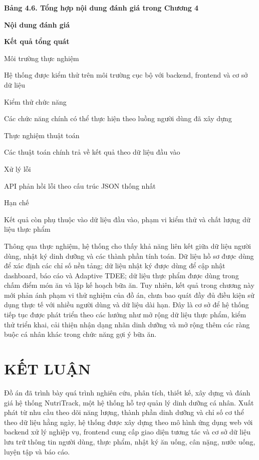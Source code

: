 \textbf{Bảng 4.6. Tổng hợp nội dung đánh giá trong Chương 4}

\textbf{Nội dung đánh giá}

\textbf{Kết quả tổng quát}

Môi trường thực nghiệm

Hệ thống được kiểm thử trên môi trường cục bộ với backend, frontend và cơ sở dữ liệu

Kiểm thử chức năng

Các chức năng chính có thể thực hiện theo luồng người dùng đã xây dựng

Thực nghiệm thuật toán

Các thuật toán chính trả về kết quả theo dữ liệu đầu vào

Xử lý lỗi

API phản hồi lỗi theo cấu trúc JSON thống nhất

Hạn chế

Kết quả còn phụ thuộc vào dữ liệu đầu vào, phạm vi kiểm thử và chất lượng dữ liệu thực phẩm

Thông qua thực nghiệm, hệ thống cho thấy khả năng liên kết giữa dữ liệu người dùng, nhật ký dinh dưỡng và các thành phần tính toán. Dữ liệu hồ sơ được dùng để xác định các chỉ số nền tảng; dữ liệu nhật ký được dùng để cập nhật dashboard, báo cáo và Adaptive TDEE; dữ liệu thực phẩm được dùng trong chấm điểm món ăn và lập kế hoạch bữa ăn. Tuy nhiên, kết quả trong chương này mới phản ánh phạm vi thử nghiệm của đồ án, chưa bao quát đầy đủ điều kiện sử dụng thực tế với nhiều người dùng và dữ liệu dài hạn. Đây là cơ sở để hệ thống tiếp tục được phát triển theo các hướng như mở rộng dữ liệu thực phẩm, kiểm thử triển khai, cải thiện nhận dạng nhãn dinh dưỡng và mở rộng thêm các ràng buộc cá nhân khác trong chức năng gợi ý bữa ăn.


\chapter*{KẾT LUẬN}
Đồ án đã trình bày quá trình nghiên cứu, phân tích, thiết kế, xây dựng và đánh giá hệ thống NutriTrack, một hệ thống hỗ trợ quản lý dinh dưỡng cá nhân. Xuất phát từ nhu cầu theo dõi năng lượng, thành phần dinh dưỡng và chỉ số cơ thể theo dữ liệu hằng ngày, hệ thống được xây dựng theo mô hình ứng dụng web với backend xử lý nghiệp vụ, frontend cung cấp giao diện tương tác và cơ sở dữ liệu lưu trữ thông tin người dùng, thực phẩm, nhật ký ăn uống, cân nặng, nước uống, luyện tập và báo cáo.


